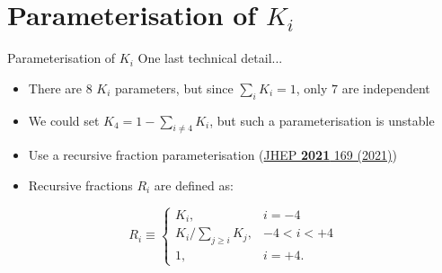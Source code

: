 \documentclass{beamer}
\begin{document}
\section{Parameterisation of \texorpdfstring{$K_i$}{Ki}}
\begin{frame}{Parameterisation of $K_i$}
  \vspace{0.0cm}
  {\Large One last technical detail...}
  \begin{itemize}
    \item{There are $8$ $K_i$ parameters, but since $\sum_iK_i = 1$, only $7$ are independent}
    \item{We could set $K_4 = 1 - \sum_{i\neq4}K_i$, but such a parameterisation is unstable}
    \item{Use a recursive fraction parameterisation (\href{https://link.springer.com/article/10.1007/JHEP02(2021)169}{JHEP \textbf{2021} 169 (2021)})}
    \item{Recursive fractions $R_i$ are defined as:}
  \end{itemize}
  \begin{center}
    \begin{equation*}
      R_i \equiv
      \begin{cases}
        K_i, & i = -4 \\
        K_i/\sum_{j\geq i}K_j, & -4 < i < +4 \\
        1, &i = +4.
      \end{cases}
    \end{equation*}
  \end{center}
\end{frame}
\end{document}
